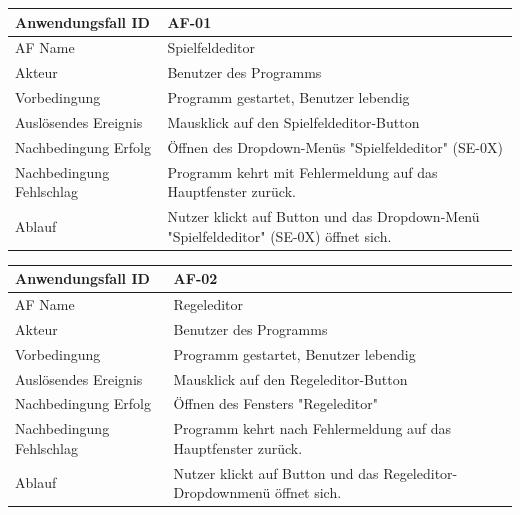 \documentclass[11pt,a4paper]{article}
\begin{document}
\pagebreak

\begin{tabular}[m]{|m{7cm}|m{9cm}|}
    \hline
    Anwendungsfall ID     & AF-01 \\
         \hline
    AF Name     &  Spielfeldeditor \\
         \hline
    Akteur&Benutzer des Programms \\
    \hline
    Vorbedingung&Programm gestartet, Benutzer lebendig\\
    \hline
    Auslösendes Ereignis&Mausklick auf den Spielfeldeditor-Button\\
    \hline
    Nachbedingung Erfolg&Öffnen des Dropdown-Menüs "Spielfeldeditor" (SE-0X)\\
    \hline
    Nachbedingung Fehlschlag&Programm kehrt mit Fehlermeldung auf das Hauptfenster zurück.\\
    \hline
    Ablauf&Nutzer klickt auf Button und das Dropdown-Menü "Spielfeldeditor" (SE-0X) öffnet sich.\\
    \hline
\end{tabular}
\par


\begin{tabular}[m]{|m{7cm}|m{9cm}|}
    \hline
    Anwendungsfall ID     & AF-02 \\
         \hline
    AF Name     &  Regeleditor \\
         \hline
    Akteur&Benutzer des Programms \\
    \hline
    Vorbedingung&Programm gestartet, Benutzer lebendig\\
    \hline
    Auslösendes Ereignis&Mausklick auf den Regeleditor-Button\\
    \hline
    Nachbedingung Erfolg&Öffnen des Fensters "Regeleditor"\\
    \hline
    Nachbedingung Fehlschlag&Programm kehrt nach Fehlermeldung auf das Hauptfenster zurück.\\
    \hline
    Ablauf&Nutzer klickt auf Button und das Regeleditor-Dropdownmenü öffnet sich.\\
    \hline
\end{tabular}
\par
\end{document}
